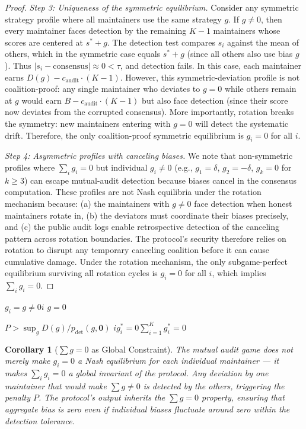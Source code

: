 \documentclass[12pt,a4paper]{article}
\newtheorem{corollary}[theorem]{Corollary}
\theoremstyle{remark}
\newcommand{\auditCost}{c_{\text{audit}}}
\begin{document}
\begin{proof}
\textit{Step 3: Uniqueness of the symmetric equilibrium.}
Consider any symmetric strategy profile where all maintainers use the same
strategy $g$. If $g \neq 0$, then every maintainer faces detection by the
remaining $K-1$ maintainers whose scores are centered at $s^* + g$. The
detection test compares $s_i$ against the mean of others, which in the
symmetric case equals $s^* + g$ (since all others also use bias $g$).
Thus $|s_i - \text{consensus}| \approx 0 < \tau$, and detection fails.
In this case, each maintainer earns $D(g) - \auditCost \cdot (K-1)$.
However, this symmetric-deviation profile is not coalition-proof: any
single maintainer who deviates to $g=0$ while others remain at $g$ would
earn $B - \auditCost \cdot (K-1)$ but also face detection (since their
score now deviates from the corrupted consensus). More importantly,
rotation breaks the symmetry: new maintainers entering with $g=0$ will
detect the systematic drift. Therefore, the only coalition-proof symmetric
equilibrium is $g_i = 0$ for all $i$.

\textit{Step 4: Asymmetric profiles with canceling biases.}
We note that non-symmetric profiles where $\sum_i g_i = 0$ but individual
$g_i \neq 0$ (e.g., $g_1 = \delta$, $g_2 = -\delta$, $g_k = 0$ for $k \geq 3$)
can escape mutual-audit detection because biases cancel in the consensus
computation. These profiles are not Nash equilibria under the rotation
mechanism because: (a) the maintainers with $g \neq 0$ face detection
when honest maintainers rotate in, (b) the deviators must coordinate
their biases precisely, and (c) the public audit logs enable retrospective
detection of the canceling pattern across rotation boundaries. The
protocol's security therefore relies on rotation to disrupt any
temporary canceling coalition before it can cause cumulative damage.
Under the rotation mechanism, the only subgame-perfect equilibrium
surviving all rotation cycles is $g_i = 0$ for all $i$, which implies
$\sum_i g_i = 0$.
\end{proof}

\noindent\textbf{}
\textbf{} 
$g_i = g \neq 0$$i$
\emph{}$g=0$

\textbf{} 
$P > \sup_g D(g) / p_{\text{det}}(g, \mathbf{0})$
$i$$g_i^* = 0$$\sum_{i=1}^{K} g_i^* = 0$

\begin{corollary}[$\sum g = 0$ as Global Constraint]\label{cor:sumgzero}
The mutual audit game does not merely make $g_i = 0$ a Nash equilibrium for each
individual maintainer — it makes $\sum_i g_i = 0$ a \textit{global invariant} of
the protocol. Any deviation by one maintainer that would make $\sum g \neq 0$
is detected by the others, triggering the penalty $P$. The protocol's output
inherits the $\sum g = 0$ property, ensuring that aggregate bias is zero even if
individual biases fluctuate around zero within the detection tolerance.
\end{corollary}
\end{document}
